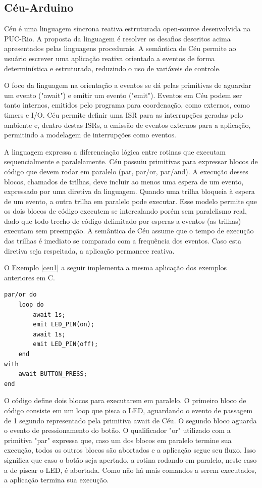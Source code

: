 \documentclass[11pt]{article}
\begin{document}
\subsection{Céu-Arduino}
\tab Céu é uma linguagem síncrona reativa estruturada open-source desenvolvida na PUC-Rio.\cite{santanna2012}\cite{githubceu} A proposta da linguagem é resolver os desafios descritos acima apresentados pelas linguagens procedurais. A semântica de Céu permite ao usuário escrever uma aplicação reativa orientada a eventos de forma determinística e estruturada, reduzindo o uso de variáveis de controle.
\par O foco da linguagem na orientação a eventos se dá pelas primitivas de aguardar um evento ("await") e emitir um evento ("emit"). Eventos em Céu podem ser tanto internos, emitidos pelo programa para coordenação, como externos, como timers e I/O. Céu permite definir uma ISR para as interrupções geradas pelo ambiente e, dentro destas ISRs, a emissão de eventos externos para a aplicação, permitindo a modelagem de interrupções como eventos.
\par A linguagem expressa a diferenciação lógica entre rotinas que executam sequencialmente e paralelamente. Céu possuiu primitivas para expressar blocos de código que devem rodar em paralelo (par, par/or, par/and). A execução desses blocos, chamados de trilhas, deve incluir ao menos uma espera de um evento, expressado por uma diretiva da linguagem. Quando uma trilha bloqueia à espera de um evento, a outra trilha em paralelo pode executar. Esse modelo permite que os dois blocos de código executem se intercalando porém sem paralelismo real, dado que todo trecho de código delimitado por esperas a eventos (as trilhas) executam sem preempção. A semântica de Céu assume que o tempo de execução das trilhas é imediato se comparado com a frequência dos eventos. Caso esta diretiva seja respeitada, a aplicação permanece reativa.
\par O Exemplo \ref{ceu1} a seguir implementa a mesma aplicação dos exemplos anteriores em C.  
\begin{lstlisting}[style=CStyle,label=ceu1,caption=Aplicação em Céu]
par/or do
    loop do
        await 1s;
        emit LED_PIN(on);
        await 1s;
        emit LED_PIN(off);
    end
with
    await BUTTON_PRESS;
end
\end{lstlisting}
\par O código define dois blocos para executarem em paralelo. O primeiro bloco de código consiste em um loop que pisca o LED, aguardando o evento de passagem de 1 segundo representado pela primitiva await de Céu. O segundo bloco aguarda o evento de pressionamento do botão. O qualificador "or" utilizado com a primitiva "par" expressa que, caso um dos blocos em paralelo termine sua execução, todos os outros blocos são abortados e a aplicação segue seu fluxo. Isso significa que caso o botão seja apertado, a rotina rodando em paralelo, neste caso a de piscar o LED, é abortada. Como não há mais comandos a serem executados, a aplicação termina sua execução.
\end{document}
